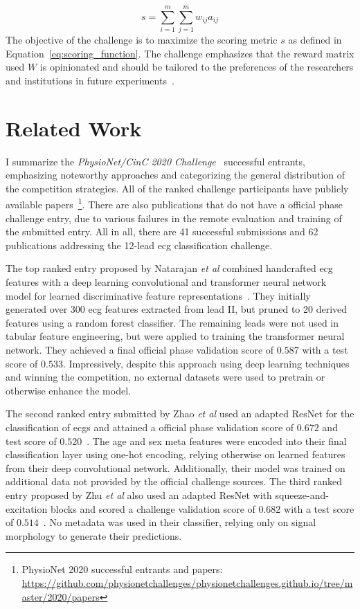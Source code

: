 \documentclass[\main/thesis.tex]{subfiles}
\begin{document}
\begin{equation}
    s = \sum_{i=1}^m\sum_{j=1}^m w_{ij}a_{ij} \label{eq:scoring_function}
\end{equation}
The objective of the challenge is to maximize the scoring metric $s$ as defined in Equation~\ref{eq:scoring_function}.
The challenge emphasizes that the reward matrix used $W$ is opinionated and should be tailored to the preferences of the researchers and institutions in future experiments~\cite{physionet_challenge_2020}.

\section{Related Work}
I summarize the \emph{PhysioNet/CinC 2020 Challenge}~\cite{physionet_challenge_2020} successful entrants, emphasizing noteworthy approaches and categorizing the general distribution of the competition strategies.
All of the ranked challenge participants have publicly available papers~\footnote{PhysioNet 2020 successful entrants and papers: \url{https://github.com/physionetchallenges/physionetchallenges.github.io/tree/master/2020/papers}}.
There are also publications that do not have a official phase challenge entry, due to various failures in the remote evaluation and training of the submitted entry.
All in all, there are 41 successful submissions and 62 publications addressing the 12-lead \gls{ecg} classification challenge.

The top ranked entry proposed by Natarajan \emph{et al} combined handcrafted \gls{ecg} features with a deep learning convolutional and transformer neural network model for learned discriminative feature representations~\cite{natarajan2020CINC-multilabel-ECG}.
They initially generated over 300 \gls{ecg} features extracted from lead II, but pruned to 20 derived features using a random forest classifier.
The remaining leads were not used in tabular feature engineering, but were applied to training the transformer neural network.
They achieved a final official phase validation score of $0.587$ with a test score of $0.533$.
Impressively, despite this approach using deep learning techniques and winning the competition, no external datasets were used to pretrain or otherwise enhance the model.

The second ranked entry submitted by Zhao \emph{et al} used an adapted ResNet for the classification of \gls{ecg}s and attained a official phase validation score of $0.672$ and test score of $0.520$~\cite{zhao2020CINC-multilabel-ECG}.
The age and sex meta features were encoded into their final classification layer using one-hot encoding, relying otherwise on learned features from their deep convolutional network.
Additionally, their model was trained on additional data not provided by the official challenge sources.
The third ranked entry proposed by Zhu \emph{et al} also used an adapted ResNet with squeeze-and-excitation blocks and scored a challenge validation score of $0.682$ with a test score of $0.514$~\cite{zhu2020CINC-multilabel-ECG}.
No metadata was used in their classifier, relying only on signal morphology to generate their predictions.
\end{document}
